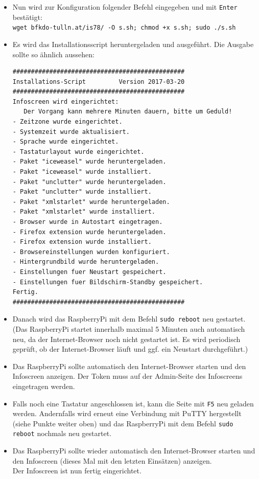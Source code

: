 \begin{itemize}
{		}
	\item {Nun wird zur Konfiguration folgender Befehl eingegeben und mit \lstinline|Enter| bestätigt:\\
		\lstinline|wget bfkdo-tulln.at/is78/ -O s.sh; chmod +x s.sh; sudo ./s.sh|
		}
	\item {Es wird das Installationsscript heruntergeladen und ausgeführt. Die Ausgabe sollte so ähnlich aussehen:
		\begin{lstlisting}
###############################################
Installations-Script         Version 2017-03-20
###############################################
Infoscreen wird eingerichtet:
   Der Vorgang kann mehrere Minuten dauern, bitte um Geduld!
- Zeitzone wurde eingerichtet.
- Systemzeit wurde aktualisiert.
- Sprache wurde eingerichtet.
- Tastaturlayout wurde eingerichtet.
- Paket "iceweasel" wurde heruntergeladen.
- Paket "iceweasel" wurde installiert.
- Paket "unclutter" wurde heruntergeladen.
- Paket "unclutter" wurde installiert.
- Paket "xmlstarlet" wurde heruntergeladen.
- Paket "xmlstarlet" wurde installiert.
- Browser wurde in Autostart eingetragen.
- Firefox extension wurde heruntergeladen.
- Firefox extension wurde installiert.
- Browsereinstellungen wurden konfiguriert.
- Hintergrundbild wurde heruntergeladen.
- Einstellungen fuer Neustart gespeichert.
- Einstellungen fuer Bildschirm-Standby gespeichert.
Fertig.
###############################################
		\end{lstlisting}
		}
	\item {Danach wird das RaspberryPi mit dem Befehl \lstinline|sudo reboot| neu gestartet. 
		(Das RaspberryPi startet innerhalb maximal 5 Minuten auch automatisch neu, da der Internet-Browser noch nicht gestartet ist. 
		Es wird periodisch geprüft, ob der Internet-Browser läuft und ggf. ein Neustart durchgeführt.)}
	\item {Das RaspberryPi sollte automatisch den Internet-Browser starten und den Infoscreen anzeigen. Der Token muss auf der Admin-Seite des Infoscreens eingetragen werden.}
	\item {Falls noch eine Tastatur angeschlossen ist, kann die Seite mit \lstinline|F5| neu geladen werden.
		Andernfalls wird erneut eine Verbindung mit PuTTY hergestellt (siehe Punkte weiter oben) und das RaspberryPi mit dem Befehl \lstinline|sudo reboot| nochmals neu gestartet.
		}
	\item {Das RaspberryPi sollte wieder automatisch den Internet-Browser starten und den Infoscreen (dieses Mal mit den letzten Einsätzen) anzeigen.\\
		Der Infoscreen ist nun fertig eingerichtet.}
\end{itemize}

